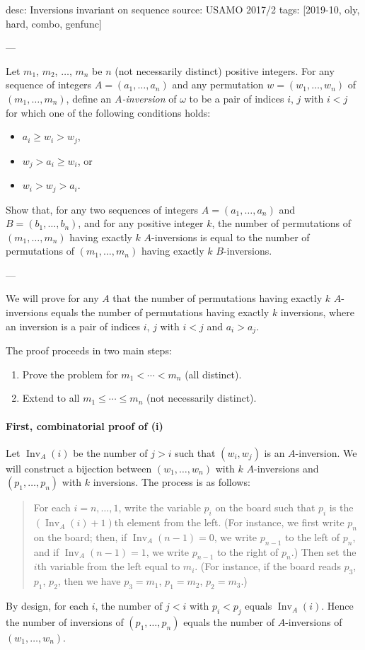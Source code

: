 desc: Inversions invariant on sequence
source: USAMO 2017/2
tags: [2019-10, oly, hard, combo, genfunc]

---

Let $m_1$, $m_2$, $\ldots$, $m_n$ be $n$ (not necessarily distinct) positive integers. For any sequence of integers $A=(a_1,\ldots,a_n)$ and any permutation $w=(w_1,\ldots,w_n)$ of $(m_1,\ldots,m_n)$, define an \emph{$A$-inversion} of $\omega$ to be a pair of indices $i$, $j$ with $i<j$ for which one of the following conditions holds:
\begin{itemize}[itemsep=0em]
    \item $a_i\ge w_i>w_j$,
    \item $w_j>a_i\ge w_i$, or
    \item $w_i>w_j>a_i$.
\end{itemize}
Show that, for any two sequences of integers $A=(a_1,\ldots,a_n)$ and $B=(b_1,\ldots,b_n)$, and for any positive integer $k$, the number of permutations of $(m_1,\ldots,m_n)$ having exactly $k$ $A$-inversions is equal to the number of permutations of $(m_1,\ldots,m_n)$ having exactly $k$ $B$-inversions.

---

We will prove for any $A$ that the number of permutations having exactly $k$ $A$-inversions equals the number of permutations having exactly $k$ inversions, where an inversion is a pair of indices $i$, $j$ with $i<j$ and $a_i>a_j$.

The proof proceeds in two main steps:
\begin{enumerate}[label=(\roman*),itemsep=0em]
    \item Prove the problem for $m_1<\cdots<m_n$ (all distinct).
    \item Extend to all $m_1\le\cdots\le m_n$ (not necessarily distinct).
\end{enumerate}

\paragraph{First, combinatorial proof of (i)} Let $\operatorname{Inv}_A(i)$ be the number of $j>i$ such that $(w_i,w_j)$ is an $A$-inversion. We will construct a bijection between $(w_1,\ldots,w_n)$ with $k$ $A$-inversions and $(p_1,\ldots,p_n)$ with $k$ inversions. The process is as follows:
\begin{quote}
    For each $i=n,\ldots,1$, write the variable $p_i$ on the board such that $p_i$ is the $(\operatorname{Inv}_A(i)+1)$th element from the left. (For instance, we first write $p_n$ on the board; then, if $\operatorname{Inv}_A(n-1)=0$, we write $p_{n-1}$ to the left of $p_n$, and if $\operatorname{Inv}_A(n-1)=1$, we write $p_{n-1}$ to the right of $p_n$.) Then set the $i$th variable from the left equal to $m_i$. (For instance, if the board reads $p_3$, $p_1$, $p_2$, then we have $p_3=m_1$, $p_1=m_2$, $p_2=m_3$.)
\end{quote}
By design, for each $i$, the number of $j<i$ with $p_i<p_j$ equals $\operatorname{Inv}_A(i)$. Hence the number of inversions of $(p_1,\ldots,p_n)$ equals the number of $A$-inversions of $(w_1,\ldots,w_n)$.

